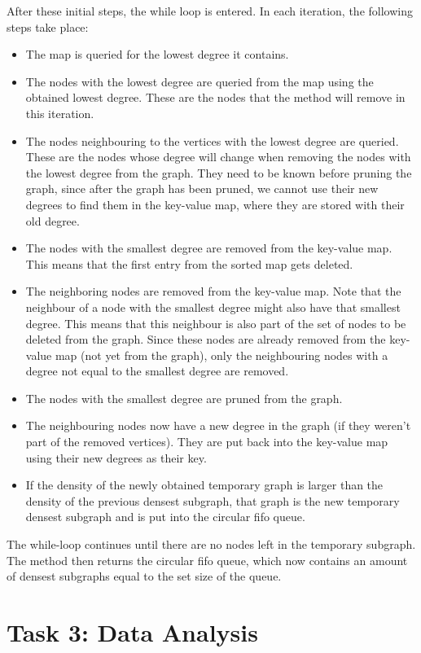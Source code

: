 \documentclass[10pt,a4paper]{article}
\begin{document}
After these initial steps, the while loop is entered. In each iteration, the following steps take place:
\begin{itemize}
\item The map is queried for the lowest degree it contains.
\item The nodes with the lowest degree are queried from the map using the obtained lowest degree. These are the nodes that the method will remove in this iteration.
\item The nodes neighbouring to the vertices with the lowest degree are queried. These are the nodes whose degree will change when removing the nodes with the lowest degree from the graph. They need to be known before pruning the graph, since after the graph has been pruned, we cannot use their new degrees to find them in the key-value map, where they are stored with their old degree.
\item The nodes with the smallest degree are removed from the key-value map. This means that the first entry from the sorted map gets deleted.
\item The neighboring nodes are removed from the key-value map. Note that the neighbour of a node with the smallest degree might also have that smallest degree. This means that this neighbour is also part of the set of nodes to be deleted from the graph. Since these nodes are already removed from the key-value map (not yet from the graph), only the neighbouring nodes with a degree not equal to the smallest degree are removed.
\item The nodes with the smallest degree are pruned from the graph.
\item The neighbouring nodes now have a new degree in the graph (if they weren't part of the removed vertices). They are put back into the key-value map using their new degrees as their key.
\item If the density of the newly obtained temporary graph is larger than the density of the previous densest subgraph, that graph is the new temporary densest subgraph and is put into the circular fifo queue.
\end{itemize}
The while-loop continues until there are no nodes left in the temporary subgraph. The method then returns the circular fifo queue, which now contains an amount of densest subgraphs equal to the set size of the queue.


\section{Task 3: Data Analysis}
\end{document}
